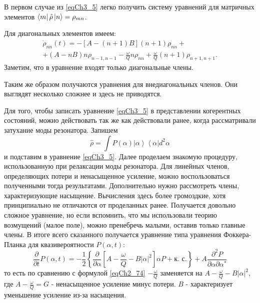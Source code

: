 В первом случае из \eqref{eqCh3_5} легко получить систему уравнений
для матричных элементов $\bra{m}\hat{\rho}\ket{n} =
\rho_{mn}$.  

Для диагональных элементов имеем:
\begin{eqnarray}
\dot{\rho}_{nn}\left(t\right) = 
-\left[A - \left(n + 1\right)B\right]\left(n + 1\right)\rho_{nn} +
\nonumber \\
+ \left(A - n B\right)n \rho_{n - 1, n - 1} 
- \frac{\omega}{Q}n \rho_{nn} + 
\frac{\omega}{Q} \left(n + 1\right)\rho_{n + 1, n + 1}.
\label{eqCh3_6}
\end{eqnarray}
Заметим, что в уравнение входят только диагональные члены. 

Таким же образом получаются уравнения для внедиагональных членов. Они
выглядят несколько сложнее и здесь не приводятся. 

Для того, чтобы записать уравнение \eqref{eqCh3_5} в представлении
когерентных состояний, можно действовать так же как действовали ранее,
когда рассматривали затухание моды резонатора. Запишем 
\[
\hat{\rho} = \int
P\left(\alpha\right)\left|\alpha\right>\left<\alpha\right| d^2 \alpha 
\]
и подставим в уравнение \eqref{eqCh3_5}. Далее проделаем знакомую
процедуру, использованную при релаксации моды резонатора. Для линейных
членов, определяющих потери и ненасыщенное усиление, можно
воспользоваться полученными тогда результатами. Дополнительно нужно
рассмотреть члены, характеризующие насыщение. Вычисления здесь более
громоздкие, хотя принципиально не отличаются от проделанных
ранее. Получается довольно сложное уравнение, но если вспомнить, что
мы использовали теорию возмущений (малое поле), можно пренебречь
малыми, оставив только главные члены\cite{bMandel2000}. 
В итоге всего сказанного получается
уравнение типа уравнения Фоккера-Планка для квазивероятности
$P\left(\alpha, t\right)$:  
\begin{equation}
\frac{\partial}{\partial t} P\left(\alpha, t\right) = 
- \frac{1}{2}\left\{ 
\frac{\partial}{\partial \alpha}
\left[
A - \frac{\omega}{Q} - B \left|\alpha\right|^2
\right] \alpha P + \mbox{к. с.}
\right\} + 
A \frac{\partial^2 P}{\partial \alpha \partial \alpha^{*}}
\label{eqCh3_7}
\end{equation}
то есть по сравнению с формулой \eqref{eqCh2_74} $-\frac{\omega}{Q}$
заменяется на $A - \frac{\omega}{Q} - B\left|\alpha\right|^2$,  где $A
- \frac{\omega}{Q} = G$ - ненасыщенное усиление минус потери. $B$ - 
характеризует уменьшение усиление из-за насыщения. 
